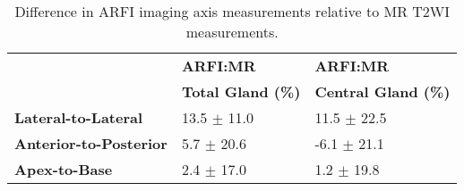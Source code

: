 \begin{table}[h!]
\centering
\caption{Difference in ARFI imaging axis measurements relative to MR T2WI measurements.}
\begin{tabular}{|l|l|l|} \hline
 & {\bf ARFI:MR} & {\bf ARFI:MR} \\
 & {\bf Total Gland (\%)} & {\bf Central Gland (\%)} \\ \hline
{\bf Lateral-to-Lateral} & 13.5 $\pm$ 11.0 & 11.5 $\pm$ 22.5 \\
{\bf Anterior-to-Posterior} & 5.7 $\pm$ 20.6 & -6.1 $\pm$ 21.1 \\
{\bf Apex-to-Base} & 2.4 $\pm$ 17.0 & 1.2 $\pm$ 19.8 \\
\hline
\end{tabular}
\label{tab:mr_arfi_axes_error}
\end{table}
